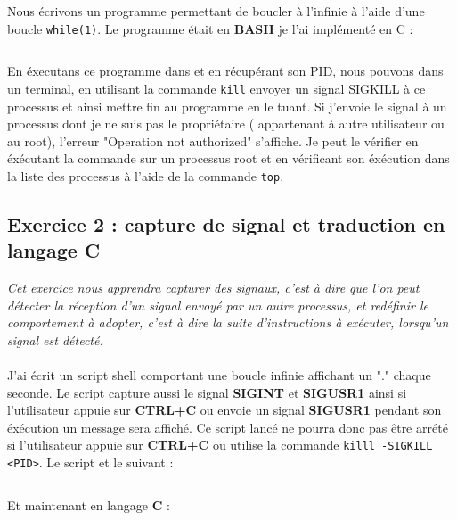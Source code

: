 Nous écrivons un programme permettant de boucler à l'infinie à l'aide d'une boucle \texttt{while(1)}. Le programme était en \textbf{BASH} je l'ai implémenté en C :
\inputminted[linenos,firstline=8,lastline=14]{cpp}{../sources/cpp/TP5-6/ex1.c}

En éxecutans ce programme dans et en récupérant son PID, nous pouvons dans un terminal, en utilisant la commande \texttt{kill} envoyer un signal SIGKILL à ce processus et ainsi mettre fin au programme en le tuant. Si j'envoie le signal à un processus dont je ne suis pas le propriétaire ( appartenant à autre utilisateur ou au root), l'erreur "Operation not authorized" s'affiche. Je peut le vérifier en éxécutant la commande sur un processus root et en vérificant son éxécution dans la liste des processus à l'aide de la commande \texttt{top}.

\subsection{Exercice 2 : capture de signal et traduction en langage C}
\textit{Cet exercice nous apprendra capturer des signaux, c’est à dire que l’on peut détecter la réception d’un signal envoyé par un autre processus, et redéfinir le comportement à adopter, c’est à dire la suite d’instructions à exécuter, lorsqu’un signal est détecté.}
\\\\
J'ai écrit un script shell comportant une boucle infinie affichant un "." chaque seconde. Le script capture aussi le signal \textbf{SIGINT} et \textbf{SIGUSR1} ainsi si l'utilisateur appuie sur \textbf
{CTRL+C} ou envoie un signal \textbf{SIGUSR1} pendant son éxécution un message sera affiché. Ce script lancé ne pourra donc pas être arrété si l'utilisateur appuie sur \textbf{CTRL+C} ou utilise la commande \texttt{killl -SIGKILL <PID>}.
Le script et le suivant :
\inputminted[linenos]{bash}{../sources/cpp/TP5-6/ex2-boucle.sh}
Et maintenant en langage \textbf{C} :
\inputminted[linenos,firstline=10,lastline=32]{cpp}{../sources/cpp/TP5-6/ex2.c}

